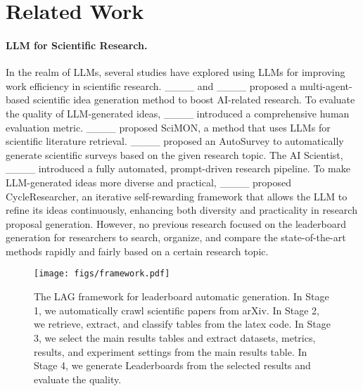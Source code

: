 \section{Related Work}
\paragraph{LLM for Scientific Research.}
In the realm of LLMs, several studies have explored using LLMs for improving work efficiency in scientific research.
____ and ____ proposed a multi-agent-based scientific idea generation method to boost AI-related research. To evaluate the quality of LLM-generated ideas, ____ introduced a comprehensive human evaluation metric. 
____ proposed SciMON, a method that uses LLMs for scientific literature retrieval.
____ proposed an AutoSurvey to automatically generate scientific surveys based on the given research topic. The AI Scientist, ____ introduced a fully automated, prompt-driven research pipeline. To make LLM-generated ideas more diverse and practical, ____ proposed CycleResearcher, an iterative self-rewarding framework that allows the LLM to refine its ideas continuously, enhancing both diversity and practicality in research proposal generation.
However, no previous research focused on the leaderboard generation for researchers to search, organize, and compare the state-of-the-art methods rapidly and fairly based on a certain research topic.

\begin{figure*}
\centering
\texttt{[image: figs/framework.pdf]}
\caption{\label{framework}The LAG framework for leaderboard automatic generation. In Stage 1, we automatically crawl scientific papers from arXiv. In Stage 2, we retrieve, extract, and classify tables from the latex code. In Stage 3,  we select the main results tables and extract datasets, metrics, results, and experiment settings from the main results table. In Stage 4, we generate Leaderboards from the selected results and evaluate the quality.}
\vspace{-.1in}
\end{figure*}

